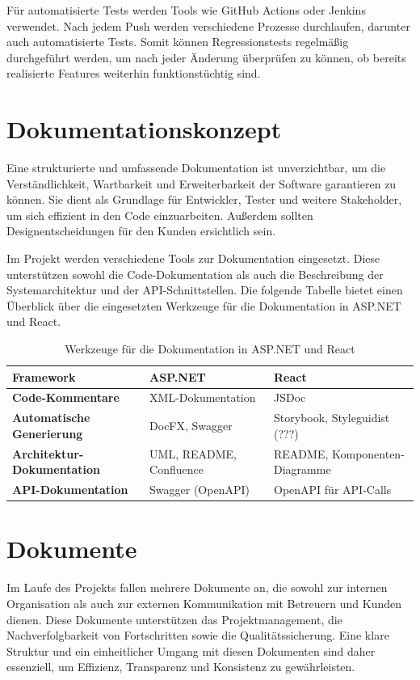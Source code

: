 \documentclass[a4paper,12pt]{article}
\begin{document}
Für automatisierte Tests werden Tools wie GitHub Actions oder Jenkins verwendet. Nach jedem Push werden verschiedene Prozesse durchlaufen, darunter auch automatisierte Tests. Somit können Regressionstests regelmäßig durchgeführt werden, um nach jeder Änderung überprüfen zu können, ob bereits realisierte Features weiterhin funktionstüchtig sind.

\newpage
\section{Dokumentationskonzept}

Eine strukturierte und umfassende Dokumentation ist unverzichtbar, um die Verständlichkeit, Wartbarkeit und Erweiterbarkeit der Software garantieren zu können. Sie dient als Grundlage für Entwickler, Tester und weitere Stakeholder, um sich effizient in den Code einzuarbeiten. Außerdem sollten Designentscheidungen für den Kunden ersichtlich sein.

Im Projekt werden verschiedene Tools zur Dokumentation eingesetzt. Diese unterstützen sowohl die Code-Dokumentation als auch die Beschreibung der Systemarchitektur und der API-Schnittstellen. Die folgende Tabelle bietet einen Überblick über die eingesetzten Werkzeuge für die Dokumentation in \mbox{ASP.NET} und React.

\begin{table}[h]
    \centering
    \begin{tabular}{|p{4.5cm}|p{4.5cm}|p{4.5cm}|}
        \hline
        \textbf{Framework}                 & \textbf{ASP.NET}        & \textbf{React}                \\ \hline
        \textbf{Code-Kommentare}           & XML-Dokumentation       & JSDoc                         \\ \hline
        \textbf{Automatische Generierung}  & DocFX, Swagger          & Storybook, Styleguidist (???) \\ \hline
        \textbf{Architektur-Dokumentation} & UML, README, Confluence & README, Komponenten-Diagramme \\ \hline
        \textbf{API-Dokumentation}         & Swagger (OpenAPI)       & OpenAPI für API-Calls         \\ \hline
    \end{tabular}
    \caption{Werkzeuge für die Dokumentation in ASP.NET und React}
    \label{tab:werkzeuge_dokumentation}
\end{table}

\newpage
\section{Dokumente}
Im Laufe des Projekts fallen mehrere Dokumente an, die sowohl zur internen Organisation als auch zur externen Kommunikation mit Betreuern und Kunden dienen. Diese Dokumente unterstützen das Projektmanagement, die Nachverfolgbarkeit von Fortschritten sowie die Qualitätssicherung. Eine klare Struktur und ein einheitlicher Umgang mit diesen Dokumenten sind daher essenziell, um Effizienz, Transparenz und Konsistenz zu gewährleisten.
\end{document}
